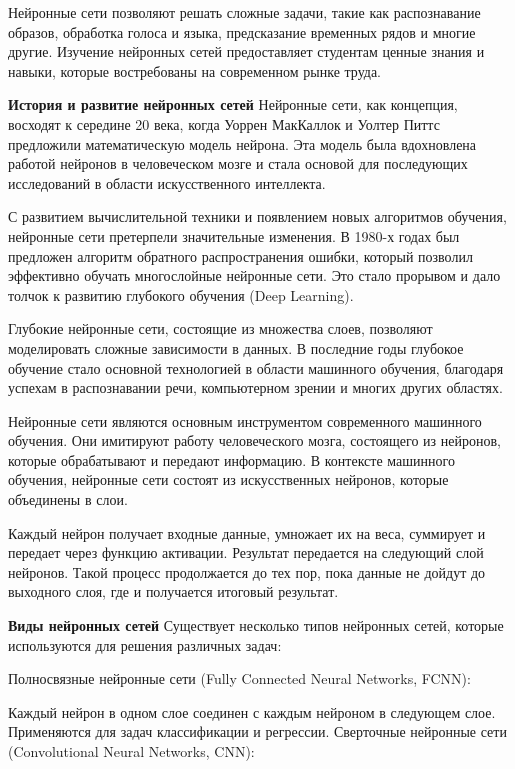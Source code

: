 \documentclass[12pt,a4paper]{article}
\begin{document}
Нейронные сети позволяют решать сложные задачи, такие как распознавание образов, обработка голоса и языка, предсказание временных рядов и многие другие. Изучение нейронных сетей предоставляет студентам ценные знания и навыки, которые востребованы на современном рынке труда.

\item \textbf{История и развитие нейронных сетей}
Нейронные сети, как концепция, восходят к середине 20 века, когда Уоррен МакКаллок и Уолтер Питтс предложили математическую модель нейрона. Эта модель была вдохновлена работой нейронов в человеческом мозге и стала основой для последующих исследований в области искусственного интеллекта.

С развитием вычислительной техники и появлением новых алгоритмов обучения, нейронные сети претерпели значительные изменения. В 1980-х годах был предложен алгоритм обратного распространения ошибки, который позволил эффективно обучать многослойные нейронные сети. Это стало прорывом и дало толчок к развитию глубокого обучения (Deep Learning).

Глубокие нейронные сети, состоящие из множества слоев, позволяют моделировать сложные зависимости в данных. В последние годы глубокое обучение стало основной технологией в области машинного обучения, благодаря успехам в распознавании речи, компьютерном зрении и многих других областях.

Нейронные сети являются основным инструментом современного машинного обучения. Они имитируют работу человеческого мозга, состоящего из нейронов, которые обрабатывают и передают информацию. В контексте машинного обучения, нейронные сети состоят из искусственных нейронов, которые объединены в слои.

Каждый нейрон получает входные данные, умножает их на веса, суммирует и передает через функцию активации. Результат передается на следующий слой нейронов. Такой процесс продолжается до тех пор, пока данные не дойдут до выходного слоя, где и получается итоговый результат.

\item \textbf{Виды нейронных сетей}
Существует несколько типов нейронных сетей, которые используются для решения различных задач:

Полносвязные нейронные сети (Fully Connected Neural Networks, FCNN):

Каждый нейрон в одном слое соединен с каждым нейроном в следующем слое.
Применяются для задач классификации и регрессии.
Сверточные нейронные сети (Convolutional Neural Networks, CNN):
\end{document}
